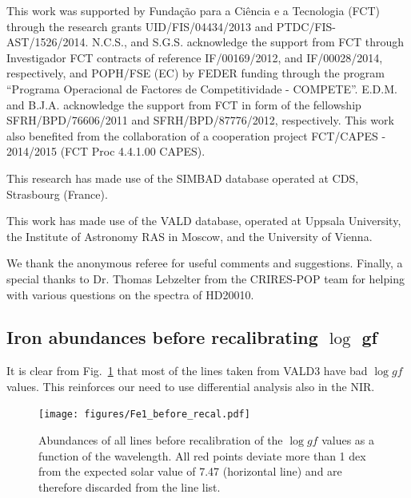 \documentclass{aa}
\begin{document}
\begin{acknowledgements}

This work was supported by Funda\c{c}\~ao para a Ci\^encia e a
Tecnologia (FCT) through the research grants UID/FIS/04434/2013 and
PTDC/FIS-AST/1526/2014. N.C.S., and S.G.S. acknowledge the support from
FCT through Investigador FCT contracts of reference IF/00169/2012, and
IF/00028/2014, respectively, and POPH/FSE (EC) by FEDER funding through
the program “Programa Operacional de Factores de Competitividade
- COMPETE”. E.D.M. and B.J.A. acknowledge the support from FCT in
form of the fellowship SFRH/BPD/76606/2011 and SFRH/BPD/87776/2012,
respectively. This work also benefited from the collaboration of a
cooperation project FCT/CAPES - 2014/2015 (FCT Proc 4.4.1.00 CAPES).

This research has made use of the SIMBAD database operated at CDS,
Strasbourg (France).

This work has made use of the VALD database, operated at Uppsala
University, the Institute of Astronomy RAS in Moscow, and the University
of Vienna.

We thank the anonymous referee for useful comments and suggestions.
Finally, a special thanks to Dr. Thomas Lebzelter from the CRIRES-POP
team for helping with various questions on the spectra of HD20010.

\end{acknowledgements}






\begin{appendix}
\section{Iron abundances before recalibrating $\log$ gf}
\label{sec:section label}

It is clear from Fig.~\ref{fig:fe1_before_recal} that most of the lines taken
from VALD3 have bad $\log\mathit{gf}$ values. This reinforces our need to
use differential analysis also in the NIR.

\begin{figure}[tbp!]
    \centering
    \texttt{[image: figures/Fe1\_before\_recal.pdf]}
    \caption{Abundances of all  lines before
    recalibration of the $\log\mathit{gf}$ values as a function of the wavelength.
    All red points deviate more than 1 dex from the expected solar value of
    7.47 (horizontal line) and are therefore discarded from the line list.}
    \label{fig:fe1_before_recal}
\end{figure}


\end{appendix}
\end{document}
